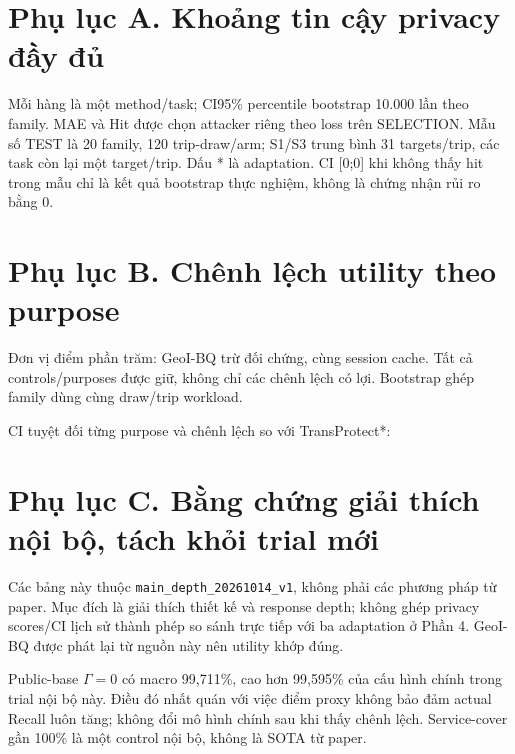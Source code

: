 \section*{Phụ lục A. Khoảng tin cậy privacy đầy đủ}
Mỗi hàng là một method/task; CI95\% percentile bootstrap 10.000 lần theo family.
MAE và Hit được chọn attacker riêng theo loss trên SELECTION. Mẫu số TEST là 20 family, 120 trip-draw/arm;
S1/S3 trung bình 31 targets/trip, các task còn lại một target/trip. Dấu * là adaptation.
CI [0;0] khi không thấy hit trong mẫu chỉ là kết quả bootstrap thực nghiệm, không là chứng nhận rủi ro bằng 0.
\begin{footnotesize}\end{footnotesize}

\clearpage
\section*{Phụ lục B. Chênh lệch utility theo purpose}
Đơn vị điểm phần trăm: GeoI-BQ trừ đối chứng, cùng session cache. Tất cả controls/purposes được giữ,
không chỉ các chênh lệch có lợi. Bootstrap ghép family dùng cùng draw/trip workload.
\begin{small}\end{small}
CI tuyệt đối từng purpose và chênh lệch so với TransProtect*:
\begin{small}\end{small}

\clearpage
\section*{Phụ lục C. Bằng chứng giải thích nội bộ, tách khỏi trial mới}
Các bảng này thuộc \texttt{main\_depth\_20261014\_v1}, không phải các phương pháp từ paper.
Mục đích là giải thích thiết kế và response depth; không ghép privacy scores/CI lịch sử thành phép
so sánh trực tiếp với ba adaptation ở Phần 4. GeoI-BQ được phát lại từ nguồn này nên utility khớp đúng.

Public-base $\Gamma=0$ có macro 99,711\%, cao hơn 99,595\% của cấu hình chính trong trial nội bộ này.
Điều đó nhất quán với việc điểm proxy không bảo đảm actual Recall luôn tăng; không đổi mô hình chính
sau khi thấy chênh lệch. Service-cover gần 100\% là một control nội bộ, không là SOTA từ paper.

